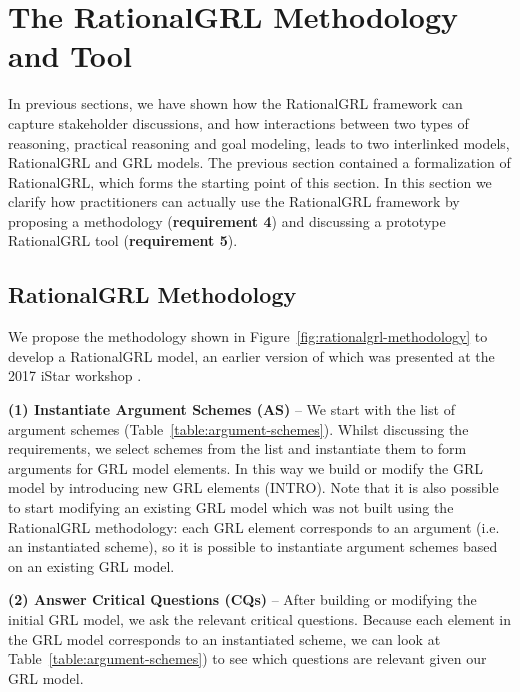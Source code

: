 \section{The RationalGRL Methodology and Tool}
\label{sect:methodology+tool}

In previous sections, we have shown how the RationalGRL framework can capture stakeholder discussions, and how interactions between two types of reasoning, practical reasoning and goal modeling, leads to two interlinked models, RationalGRL and GRL models. The previous section contained a formalization of RationalGRL, which forms the starting point of this section. In this section we clarify how practitioners can actually use the RationalGRL framework by proposing a methodology (\textbf{requirement 4}) and discussing a prototype RationalGRL tool (\textbf{requirement 5}).

\subsection{RationalGRL Methodology}
\label{sect:methodology} 

We propose the methodology shown in Figure~\ref{fig:rationalgrl-methodology} to develop a RationalGRL model, an earlier version of which was presented at the 2017 iStar workshop \cite{ghanavatiMethodology}. %

\textbf{(1) Instantiate Argument Schemes (AS)} -- We start with the list of argument schemes (Table~\ref{table:argument-schemes}). Whilst discussing the requirements, we select schemes from the list and instantiate them to form arguments for GRL model elements. In this way we build or modify the GRL model by introducing new GRL elements (\textsf{INTRO}). Note that it is also possible to start modifying an existing GRL model which was not built using the RationalGRL methodology: each GRL element corresponds to an argument (i.e. an instantiated scheme), so it is possible to instantiate argument schemes based on an existing GRL model. 

\textbf{(2) Answer Critical Questions (CQs)} -- After building or modifying the initial GRL model, we ask the relevant critical questions. Because each element in the GRL model corresponds to an instantiated scheme, we can look at Table~\ref{table:argument-schemes}) to see which questions are relevant given our GRL model. 

